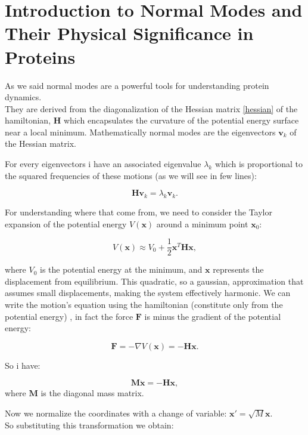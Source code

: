 \documentclass[English, Lau, oneside]{sapthesis}
\begin{document}
\section{Introduction to Normal Modes and Their Physical Significance in Proteins}
\noindent As we said normal modes are a powerful tools for understanding protein dynamics. \\
They are derived from the diagonalization of the Hessian matrix \eqref{hessian} of the hamiltonian, \( \mathbf{H} \)
which encapsulates the curvature of the potential energy surface near a local minimum. 
Mathematically normal modes are the eigenvectors \( \mathbf{v}_k \) of the Hessian matrix. 

For every eigenvectors i have an associated eigenvalue \( \lambda_k \) which is proportional to the squared frequencies of these motions (as we will see in few lines):

\begin{equation}
\mathbf{H} \mathbf{v}_k = \lambda_k \mathbf{v}_k. \label{equazione}
\end{equation}

For understanding where that come from, we need to consider the Taylor expansion of the potential energy \( V(\mathbf{x}) \) around a minimum point \( \mathbf{x}_0 \):

\begin{equation}
V(\mathbf{x}) \approx V_0 + \frac{1}{2} \mathbf{x}^T \mathbf{H} \mathbf{x},
\end{equation}

where \( V_0 \) is the potential energy at the minimum, and \( \mathbf{x} \) represents the displacement from equilibrium. This quadratic, so a gaussian, approximation that assumes small displacements, making the system effectively harmonic.
We can write the motion's equation using the hamiltonian (constitute only from the potential energy) , in fact the force \( \mathbf{F} \) is minus the gradient of the potential energy:

\begin{equation}
\mathbf{F} = -\nabla V(\mathbf{x}) = -\mathbf{H} \mathbf{x}.
\end{equation}

So i have:

\begin{equation}
\mathbf{M} \ddot{\mathbf{x}} = -\mathbf{H} \mathbf{x},
\end{equation}
where \( \mathbf{M} \) is the diagonal mass matrix.

Now we normalize the coordinates with a change of variable: \( \mathbf{x}' = \sqrt{M} \mathbf{x}\). \\
So substituting this transformation we obtain:
\end{document}
